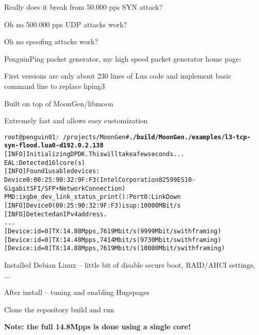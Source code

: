 \documentclass[Screen16to9,17pt]{foils}
\begin{document}

\centerline{Really does it break from 50.000 pps SYN attack?}



\centerline{Oh no 500.000 pps UDP attacks work?}


\centerline{Oh no spoofing attacks work?}




\begin{list2}
\item PenguinPing packet generator, my high speed packet generator
home page: 
\item First versions are only about 230 lines of Lua code and implement basic command line to replace hping3
\item Built on top of MoonGen/libmoon 
\end{list2}

\centerline{Extremely fast and allows easy customization}



\begin{alltt}\footnotesize
root@penguin01:~/projects/MoonGen# {\bfseries ./build/MoonGen ./examples/l3-tcp-syn-flood.lua 0 -d 192.0.2.138}
[INFO]  Initializing DPDK. This will take a few seconds...
EAL: Detected 16 lcore(s)
[INFO]  Found 1 usable devices:
   Device 0: 00:25:90:32:9F:F3 (Intel Corporation 82599ES 10-Gigabit SFI/SFP+ Network Connection)
PMD: ixgbe_dev_link_status_print():  Port 0: Link Down
[INFO]  Device 0 (00:25:90:32:9F:F3) is up: 10000 MBit/s
[INFO]  Detected an IPv4 address.
...
[Device: id=0] TX: 14.88 Mpps, 7619 Mbit/s (9999 Mbit/s with framing)
[Device: id=0] TX: 14.48 Mpps, 7414 Mbit/s (9730 Mbit/s with framing)
[Device: id=0] TX: 14.88 Mpps, 7619 Mbit/s (10000 Mbit/s with framing)
\end{alltt}

\begin{list2}
\item Installed Debian Linux -- little bit of disable secure boot, RAID/AHCI settings, ...
\item After install -- tuning and enabling Hugepages
\item Clone the repository  build and run
\item {\bf Note: the full 14.8Mpps is done using a single core!}
\end{list2}
\end{document}
